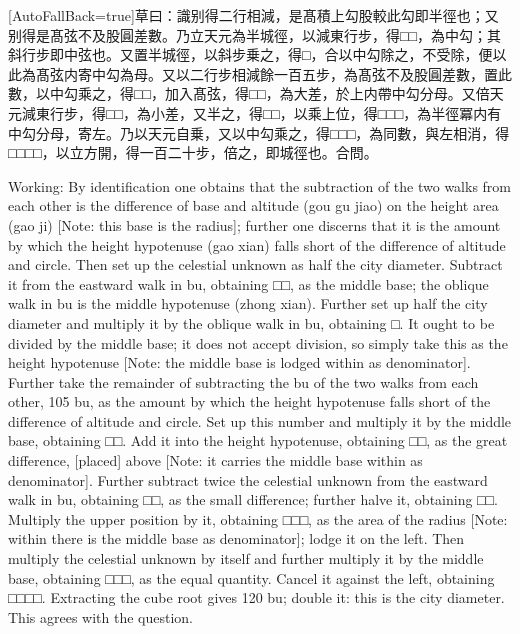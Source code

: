 \documentclass[11pt]{article}
\newcommand{\zhsmall}{\footnotesize\color{black!70}}
\newcommand{\unitlabel}[1]{\marginpar{\raggedleft\tiny\color{gray}#1}}
\newenvironment{unitzh}{\par\CJKfontspec{Noto Serif CJK SC}[AutoFallBack=true]\large\linespread{1.25}\selectfont}{\par}
\newenvironment{uniten}{\par\small\color{black!85}}{\par\medskip}
\begin{document}
\begin{unitzh}\unitlabel{ceyuan-017.34}草曰：識别得二行相減，是髙積上勾股較{\zhsmall 此勾即半徑也}；又别得是髙弦不及股圓差數。乃立天元為半城徑，以減東行步，得□□，為中勾；其斜行步即中弦也。又置半城徑，以斜步乗之，得□，合以中勾除之，不受除，便以此為髙弦{\zhsmall 内寄中勾為母}。又以二行步相減餘一百五步，為髙弦不及股圓差數，置此數，以中勾乘之，得□□，加入髙弦，得□□，為大差，於上{\zhsmall 内帶中勾分母}。又倍天元減東行步，得□□，為小差，又半之，得□□，以乘上位，得□□□，為半徑冪{\zhsmall 内有中勾分母}，寄左。乃以天元自乗，又以中勾乘之，得□□□，為同數，與左相消，得□□□□，以立方開，得一百二十步，倍之，即城徑也。合問。\end{unitzh}
\begin{uniten}Working: By identification one obtains that the subtraction of the two walks from each other is the difference of base and altitude (gou gu jiao) on the height area (gao ji) [Note: this base is the radius]; further one discerns that it is the amount by which the height hypotenuse (gao xian) falls short of the difference of altitude and circle. Then set up the celestial unknown as half the city diameter. Subtract it from the eastward walk in bu, obtaining □□, as the middle base; the oblique walk in bu is the middle hypotenuse (zhong xian). Further set up half the city diameter and multiply it by the oblique walk in bu, obtaining □. It ought to be divided by the middle base; it does not accept division, so simply take this as the height hypotenuse [Note: the middle base is lodged within as denominator]. Further take the remainder of subtracting the bu of the two walks from each other, 105 bu, as the amount by which the height hypotenuse falls short of the difference of altitude and circle. Set up this number and multiply it by the middle base, obtaining □□. Add it into the height hypotenuse, obtaining □□, as the great difference, [placed] above [Note: it carries the middle base within as denominator]. Further subtract twice the celestial unknown from the eastward walk in bu, obtaining □□, as the small difference; further halve it, obtaining □□. Multiply the upper position by it, obtaining □□□, as the area of the radius [Note: within there is the middle base as denominator]; lodge it on the left. Then multiply the celestial unknown by itself and further multiply it by the middle base, obtaining □□□, as the equal quantity. Cancel it against the left, obtaining □□□□. Extracting the cube root gives 120 bu; double it: this is the city diameter. This agrees with the question.\end{uniten}
\end{document}
